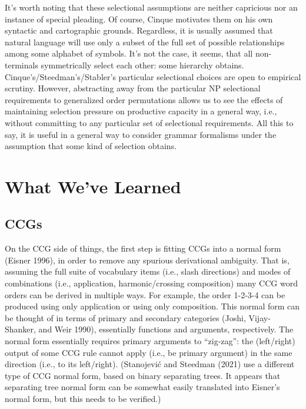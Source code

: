 \documentclass[12pt]{article}
\begin{document}
\noindent It's worth noting that these selectional assumptions are neither capricious nor an instance of special pleading. Of course, Cinque motivates them on his own syntactic and cartographic grounds. Regardless, it is usually assumed that natural language will use only a subset of the full set of possible relationships among some alphabet of symbols. It's not the case, it seems, that all non-terminals symmetrically select each other: some hierarchy obtains. Cinque's/Steedman's/Stabler's particular selectional choices are open to empirical scrutiny. However, abstracting away from the particular NP selectional requirements to generalized order permutations allows us to see the effects of maintaining selection pressure on productive capacity in a general way, i.e., without committing to any particular set of selectional requirements. All this to say, it is useful in a general way to consider grammar formalisms under the assumption that some kind of selection obtains.

\section{What We've Learned}

\subsection{CCGs}

\noindent On the CCG side of things, the first step is fitting CCGs into a normal form (Eisner 1996), in order to remove any spurious derivational ambiguity. That is, assuming the full suite of vocabulary items (i.e., slash directions) and modes of combinations (i.e., application, harmonic/crossing composition) many CCG word orders can be derived in multiple ways. For example, the order 1-2-3-4 can be produced using only application or using only composition. This normal form can be thought of in terms of primary and secondary categories (Joshi, Vijay-Shanker, and Weir 1990), essentially functions and arguments, respectively. The normal form essentially requires primary arguments to ``zig-zag'': the (left/right) output of some CCG rule cannot apply (i.e., be primary argument) in the same direction (i.e., to its left/right). (Stanojevi\'{c} and Steedman (2021) use a different type of CCG normal form, based on binary separating trees. It appears that separating tree normal form can be somewhat easily translated into Eisner's normal form, but this needs to be verified.)\\
\end{document}
